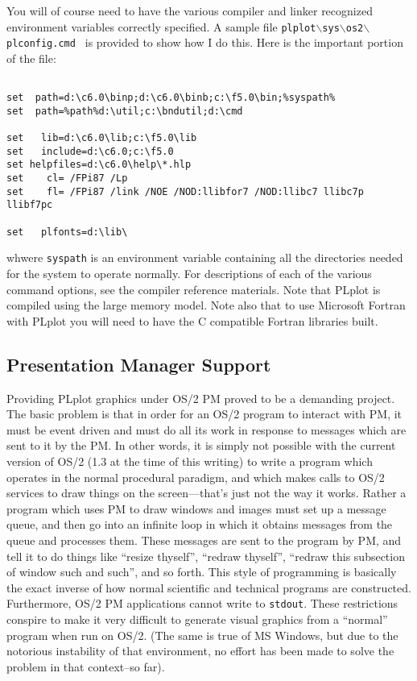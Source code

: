 You will of course need to have the various compiler and linker recognized
environment variables correctly specified.  A sample file 
{\tt plplot$\backslash$sys$\backslash$os2$\backslash$plconfig.cmd } is 
provided to show how I do this.  Here 
is the important portion of the file:
\begin{verbatim} 

set	 path=d:\c6.0\binp;d:\c6.0\binb;c:\f5.0\bin;%syspath%
set	 path=%path%d:\util;c:\bndutil;d:\cmd

set	  lib=d:\c6.0\lib;c:\f5.0\lib
set   include=d:\c6.0;c:\f5.0
set helpfiles=d:\c6.0\help\*.hlp
set	   cl= /FPi87 /Lp
set	   fl= /FPi87 /link /NOE /NOD:llibfor7 /NOD:llibc7 llibc7p llibf7pc

set   plfonts=d:\lib\

\end{verbatim}
whwere {\tt syspath} is an environment variable containing all the directories
needed for the system to operate normally.
For descriptions of each of the various command options, see the compiler
reference materials.  Note that PLplot is compiled using the large memory 
model.  Note also that to use Microsoft Fortran with PLplot you 
will need to have the C compatible Fortran libraries built.

\subsection{Presentation Manager Support}

Providing PLplot graphics under OS/2 PM proved to be a demanding project.
The basic problem is that in order for an OS/2 program to interact with
PM, it must be event driven and must do all its work in response to messages
which are sent to it by the PM.  In other words, it is simply not possible
with the current version of OS/2 (1.3 at the time of this writing) to 
write a program which operates in the normal procedural paradigm, and which
makes calls to OS/2 services to draw things on the screen---that's just
not the way it works.  Rather a program which uses PM to draw windows and 
images must set up a message queue, and then go into an infinite loop
in which it obtains messages from the queue and processes them.  These
messages are sent to the program by PM, and tell it to do things like ``resize
thyself'',  ``redraw thyself'', ``redraw this subsection of window such
and such'', and so forth.  This style
of programming is basically the exact inverse of how normal scientific and
technical programs are constructed.  Furthermore, OS/2 PM applications 
cannot write to {\tt stdout}.  These restrictions conspire to make it
very difficult to generate visual graphics from a ``normal'' program when
run on OS/2.  (The same is true of MS Windows, but due to the notorious
instability of that environment, no effort has been made to solve the
problem in that context--so far).


